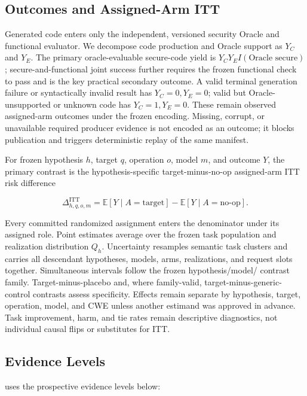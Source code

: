 \subsection{Outcomes and Assigned-Arm ITT}

Generated code enters only the independent, versioned security Oracle and
functional evaluator. We decompose code production and Oracle support as
$Y_C$ and $Y_E$. The primary oracle-evaluable secure-code yield is
$Y_CY_E I(\text{Oracle secure})$; secure-and-functional joint success further
requires the frozen functional check to pass and is the key practical
secondary outcome. A valid terminal generation failure or syntactically
invalid result has $Y_C=0,Y_E=0$; valid but Oracle-unsupported or unknown code
has $Y_C=1,Y_E=0$. These remain observed assigned-arm outcomes under the
frozen encoding. Missing, corrupt, or unavailable required producer evidence
is not encoded as an outcome; it blocks publication and triggers deterministic
replay of the same manifest.

For frozen hypothesis $h$, target $q$, operation $o$, model $m$, and outcome
$Y$, the primary contrast is the hypothesis-specific target-minus-no-op
assigned-arm ITT risk difference

\[
  \Delta^{\mathrm{ITT}}_{h,q,o,m}
  = \mathbb{E}[Y \mid A=\mathrm{target}]
  - \mathbb{E}[Y \mid A=\mathrm{no\mbox{-}op}].
\]

Every committed randomized assignment enters the denominator under its
assigned role. Point estimates average over the frozen task population and
realization distribution $Q_h$. Uncertainty resamples semantic task clusters
and carries all descendant hypotheses, models, arms, realizations, and request
slots together. Simultaneous intervals follow the frozen hypothesis/model/
contrast family. Target-minus-placebo and, where family-valid,
target-minus-generic-control contrasts assess specificity. Effects remain
separate by hypothesis, target, operation, model, and CWE unless another
estimand was approved in advance. Task improvement, harm, and tie rates remain
descriptive diagnostics, not individual causal flips or substitutes for ITT.

\subsection{Evidence Levels}

\model uses the prospective evidence levels below:

